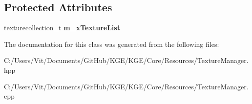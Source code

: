 \subsection*{Protected Attributes}
\begin{DoxyCompactItemize}
\item 
\hypertarget{class_k_g_e_1_1_texture_manager_a802c199bf3be354d1ee2e1cdfb836c32}{texturecollection\-\_\-t {\bfseries m\-\_\-x\-Texture\-List}}\label{class_k_g_e_1_1_texture_manager_a802c199bf3be354d1ee2e1cdfb836c32}

\end{DoxyCompactItemize}


The documentation for this class was generated from the following files\-:\begin{DoxyCompactItemize}
\item 
C\-:/\-Users/\-Vit/\-Documents/\-Git\-Hub/\-K\-G\-E/\-K\-G\-E/\-Core/\-Resources/Texture\-Manager.\-hpp\item 
C\-:/\-Users/\-Vit/\-Documents/\-Git\-Hub/\-K\-G\-E/\-K\-G\-E/\-Core/\-Resources/Texture\-Manager.\-cpp\end{DoxyCompactItemize}
